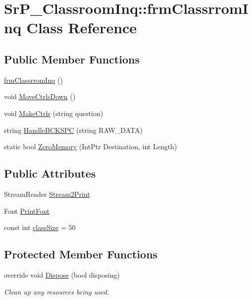 \hypertarget{class_sr_p___classroom_inq_1_1frm_classrrom_inq}{
\section{\-Sr\-P\-\_\-\-Classroom\-Inq\-:\-:frm\-Classrrom\-Inq \-Class \-Reference}
\label{class_sr_p___classroom_inq_1_1frm_classrrom_inq}
}
\subsection*{\-Public \-Member \-Functions}
\begin{DoxyCompactItemize}
\item 
\hyperlink{class_sr_p___classroom_inq_1_1frm_classrrom_inq_ad4c66414acc8ac456211b3f8024ed68c}{frm\-Classrrom\-Inq} ()
\item 
void \hyperlink{class_sr_p___classroom_inq_1_1frm_classrrom_inq_aa37996d682b5f7d39e5e53d8edd658ab}{\-Move\-Ctrls\-Down} ()
\item 
void \hyperlink{class_sr_p___classroom_inq_1_1frm_classrrom_inq_a8ae3b3804b16d4c67b8ff652eb5488ed}{\-Make\-Ctrls} (string question)
\item 
string \hyperlink{class_sr_p___classroom_inq_1_1frm_classrrom_inq_aecc5d7b6ce2373bb863ce0eefa481783}{\-Handle\-B\-C\-K\-S\-P\-C} (string \-R\-A\-W\-\_\-\-D\-A\-T\-A)
\item 
static bool \hyperlink{class_sr_p___classroom_inq_1_1frm_classrrom_inq_a9e1b1e677182d3bb85b5f2bbc80d60fb}{\-Zero\-Memory} (\-Int\-Ptr \-Destination, int \-Length)
\end{DoxyCompactItemize}
\subsection*{\-Public \-Attributes}
\begin{DoxyCompactItemize}
\item 
\-Stream\-Reader \hyperlink{class_sr_p___classroom_inq_1_1frm_classrrom_inq_aa030f46a7915eae3a0b8b88661be51a8}{\-Stream2\-Print}
\item 
\-Font \hyperlink{class_sr_p___classroom_inq_1_1frm_classrrom_inq_a314e4a61ea8458c5198273335dcf0b5f}{\-Print\-Font}
\item 
const int \hyperlink{class_sr_p___classroom_inq_1_1frm_classrrom_inq_a78d9aab335edfe53d39036b9d89928a8}{class\-Size} = 50
\end{DoxyCompactItemize}
\subsection*{\-Protected \-Member \-Functions}
\begin{DoxyCompactItemize}
\item 
override void \hyperlink{class_sr_p___classroom_inq_1_1frm_classrrom_inq_a7e6095e2ed04a53088833156d8d205b1}{\-Dispose} (bool disposing)
\begin{DoxyCompactList}\small\item\em \-Clean up any resources being used. \end{DoxyCompactList}\end{DoxyCompactItemize}


